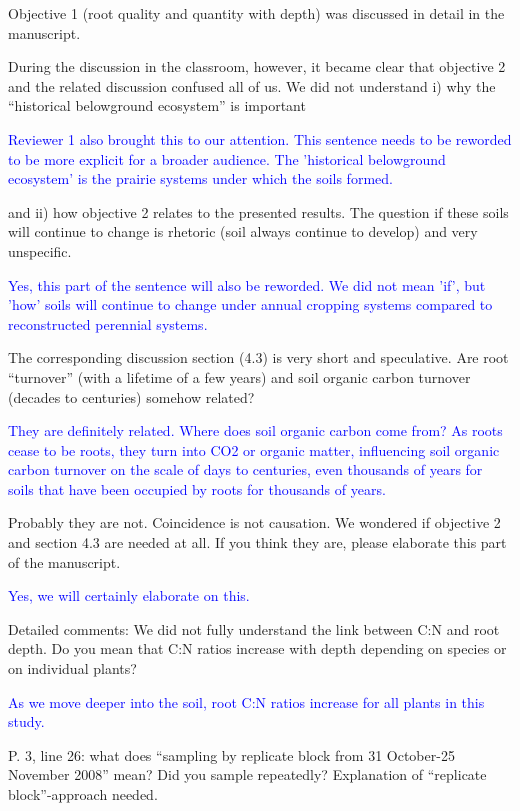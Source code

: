 \documentclass[]{article}
\begin{document}
Objective 1 (root quality and quantity with depth) was discussed in
detail in the manuscript.

During the discussion in the classroom, however, it became clear that
objective 2 and the related discussion confused all of us. We did not
understand i) why the ``historical belowground ecosystem'' is important

\textcolor{blue}{Reviewer 1 also brought this to our attention. This sentence needs to be reworded to be more explicit for a broader audience. The 'historical belowground ecosystem' is the prairie systems under which the soils formed.}

and ii) how objective 2 relates to the presented results. The question
if these soils will continue to change is rhetoric (soil always continue
to develop) and very unspecific.

\textcolor{blue}{Yes, this part of the sentence will also be reworded. We did not mean 'if', but 'how' soils will continue to change under annual cropping systems compared to reconstructed perennial systems.}

The corresponding discussion section (4.3) is very short and
speculative. Are root ``turnover'' (with a lifetime of a few years) and
soil organic carbon turnover (decades to centuries) somehow related?

\textcolor{blue}{They are definitely related. Where does soil organic carbon come from? As roots cease to be roots, they turn into CO2 or organic matter, influencing soil organic carbon turnover on the scale of days to centuries, even thousands of years for soils that have been occupied by roots for thousands of years.}

Probably they are not. Coincidence is not causation. We wondered if
objective 2 and section 4.3 are needed at all. If you think they are,
please elaborate this part of the manuscript.

\textcolor{blue}{Yes, we will certainly elaborate on this.}

Detailed comments: We did not fully understand the link between C:N and
root depth. Do you mean that C:N ratios increase with depth depending on
species or on individual plants?

\textcolor{blue}{As we move deeper into the soil, root C:N ratios increase for all plants in this study.}

P. 3, line 26: what does ``sampling by replicate block from 31
October-25 November 2008'' mean? Did you sample repeatedly? Explanation
of ``replicate block''-approach needed.
\end{document}
